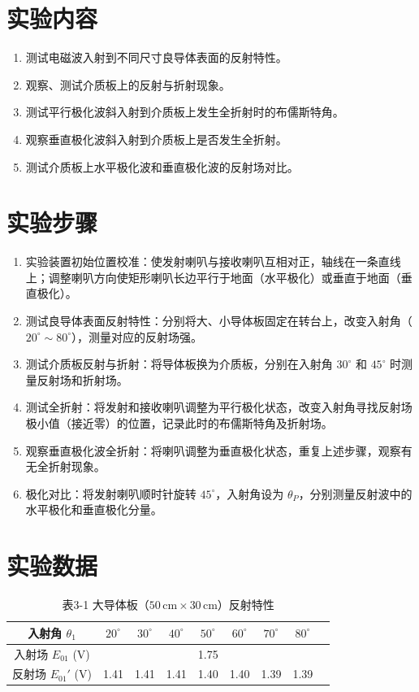 \documentclass{../ElectromagneticFieldTemplate}
\begin{document}
\section{实验内容}

\begin{enumerate}
    \item 测试电磁波入射到不同尺寸良导体表面的反射特性。
    \item 观察、测试介质板上的反射与折射现象。
    \item 测试平行极化波斜入射到介质板上发生全折射时的布儒斯特角。
    \item 观察垂直极化波斜入射到介质板上是否发生全折射。
    \item 测试介质板上水平极化波和垂直极化波的反射场对比。
\end{enumerate}

\section{实验步骤}

\begin{enumerate}
    \item 实验装置初始位置校准：使发射喇叭与接收喇叭互相对正，轴线在一条直线上；调整喇叭方向使矩形喇叭长边平行于地面（水平极化）或垂直于地面（垂直极化）。
    \item 测试良导体表面反射特性：分别将大、小导体板固定在转台上，改变入射角（\(20^\circ \sim 80^\circ\)），测量对应的反射场强。
    \item 测试介质板反射与折射：将导体板换为介质板，分别在入射角 \(30^\circ\) 和 \(45^\circ\) 时测量反射场和折射场。
    \item 测试全折射：将发射和接收喇叭调整为平行极化状态，改变入射角寻找反射场极小值（接近零）的位置，记录此时的布儒斯特角及折射场。
    \item 观察垂直极化波全折射：将喇叭调整为垂直极化状态，重复上述步骤，观察有无全折射现象。
    \item 极化对比：将发射喇叭顺时针旋转 \(45^\circ\)，入射角设为 \(\theta_P\)，分别测量反射波中的水平极化和垂直极化分量。
\end{enumerate}

\section{实验数据}

\begin{table}[H]
    \centering
    \caption{表3-1 大导体板（\(50\,\text{cm} \times 30\,\text{cm}\)）反射特性}
    \renewcommand{\arraystretch}{1.3}
    \begin{tabular}{|c|c|c|c|c|c|c|c|c|}
        \hline
        入射角 \(\theta_1\) & \(20^\circ\) & \(30^\circ\) & \(40^\circ\) & \(50^\circ\) & \(60^\circ\) & \(70^\circ\) & \(80^\circ\) \\
        \hline
        入射场 \(E_{01}\) (V) & \multicolumn{7}{c|}{1.75} \\
        \hline
        反射场 \(E_{01}'\) (V) & 1.41 & 1.41 & 1.41 & 1.40 & 1.40 & 1.39 & 1.39 \\
        \hline
    \end{tabular}
\end{table}
\end{document}
